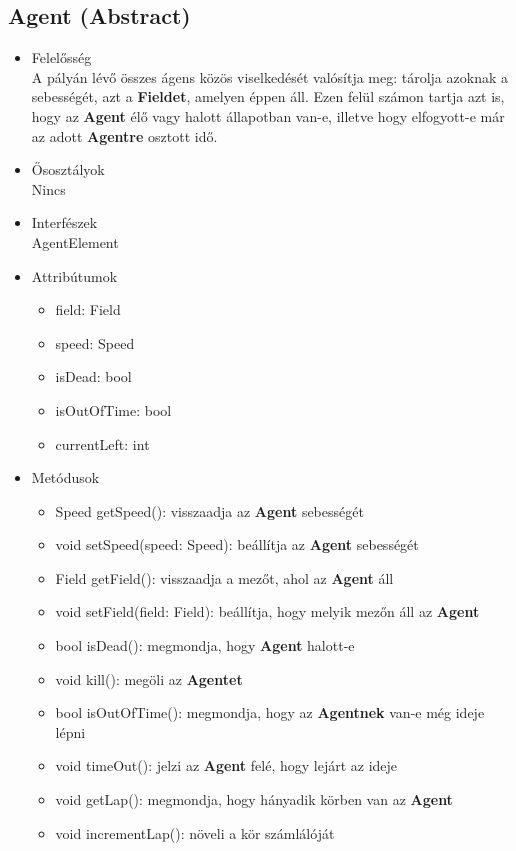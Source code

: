 \subsection{Agent (Abstract)}
\begin{itemize}

\item Felelősség\\
A pályán lévő összes ágens közös viselkedését valósítja meg: tárolja azoknak a sebességét, azt a \textbf{Fieldet}, amelyen éppen áll. Ezen felül számon tartja azt is, hogy az \textbf{Agent} élő vagy halott állapotban van-e, illetve hogy elfogyott-e már az adott \textbf{Agentre} osztott idő.

\item Ősosztályok\\
Nincs

\item Interfészek\\
AgentElement

\item Attribútumok\\
\begin{itemize}
    \item field: Field
    \item speed: Speed
    \item isDead: bool
    \item isOutOfTime: bool
    \item currentLeft: int
\end{itemize}

\item Metódusok\\

\begin{itemize}
    \item Speed getSpeed(): visszaadja az \textbf{Agent} sebességét
    \item void setSpeed(speed: Speed): beállítja az \textbf{Agent} sebességét
    \item Field getField(): visszaadja a mezőt, ahol az \textbf{Agent} áll
    \item void setField(field: Field): beállítja, hogy melyik mezőn áll az \textbf{Agent}
    \item bool isDead(): megmondja, hogy \textbf{Agent} halott-e
    \item void kill(): megöli az \textbf{Agentet}
    \item bool isOutOfTime(): megmondja, hogy az \textbf{Agentnek} van-e még ideje lépni
    \item void timeOut(): jelzi az \textbf{Agent} felé, hogy lejárt az ideje
    \item void getLap(): megmondja, hogy hányadik körben van az \textbf{Agent}
    \item void incrementLap(): növeli a kör számlálóját
\end{itemize}

\end{itemize}

